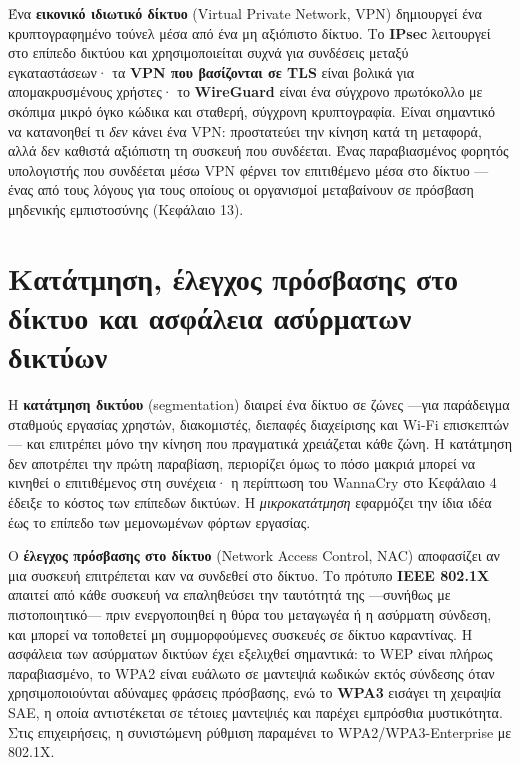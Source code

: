 Ένα \textbf{εικονικό ιδιωτικό δίκτυο} (Virtual Private Network, VPN) δημιουργεί ένα κρυπτογραφημένο τούνελ μέσα από ένα μη αξιόπιστο δίκτυο. Το \textbf{IPsec} λειτουργεί στο επίπεδο δικτύου και χρησιμοποιείται συχνά για συνδέσεις μεταξύ εγκαταστάσεων· τα \textbf{VPN που βασίζονται σε TLS} είναι βολικά για απομακρυσμένους χρήστες· το \textbf{WireGuard} είναι ένα σύγχρονο πρωτόκολλο με σκόπιμα μικρό όγκο κώδικα και σταθερή, σύγχρονη κρυπτογραφία. Είναι σημαντικό να κατανοηθεί τι \emph{δεν} κάνει ένα VPN: προστατεύει την κίνηση κατά τη μεταφορά, αλλά δεν καθιστά αξιόπιστη τη συσκευή που συνδέεται. Ένας παραβιασμένος φορητός υπολογιστής που συνδέεται μέσω VPN φέρνει τον επιτιθέμενο μέσα στο δίκτυο —ένας από τους λόγους για τους οποίους οι οργανισμοί μεταβαίνουν σε πρόσβαση μηδενικής εμπιστοσύνης (Κεφάλαιο 13).

\section{Κατάτμηση, έλεγχος πρόσβασης στο δίκτυο και ασφάλεια ασύρματων δικτύων}\label{sec:6.6}
Η \textbf{κατάτμηση δικτύου} (segmentation) διαιρεί ένα δίκτυο σε ζώνες —για παράδειγμα σταθμούς εργασίας χρηστών, διακομιστές, διεπαφές διαχείρισης και Wi-Fi επισκεπτών— και επιτρέπει μόνο την κίνηση που πραγματικά χρειάζεται κάθε ζώνη. Η κατάτμηση δεν αποτρέπει την πρώτη παραβίαση, περιορίζει όμως το πόσο μακριά μπορεί να κινηθεί ο επιτιθέμενος στη συνέχεια· η περίπτωση του WannaCry στο Κεφάλαιο 4 έδειξε το κόστος των επίπεδων δικτύων. Η \emph{μικροκατάτμηση} εφαρμόζει την ίδια ιδέα έως το επίπεδο των μεμονωμένων φόρτων εργασίας.

Ο \textbf{έλεγχος πρόσβασης στο δίκτυο} (Network Access Control, NAC) αποφασίζει αν μια συσκευή επιτρέπεται καν να συνδεθεί στο δίκτυο. Το πρότυπο \textbf{IEEE 802.1X} απαιτεί από κάθε συσκευή να επαληθεύσει την ταυτότητά της —συνήθως με πιστοποιητικό— πριν ενεργοποιηθεί η θύρα του μεταγωγέα ή η ασύρματη σύνδεση, και μπορεί να τοποθετεί μη συμμορφούμενες συσκευές σε δίκτυο καραντίνας. Η ασφάλεια των ασύρματων δικτύων έχει εξελιχθεί σημαντικά: το WEP είναι πλήρως παραβιασμένο, το WPA2 είναι ευάλωτο σε μαντεψιά κωδικών εκτός σύνδεσης όταν χρησιμοποιούνται αδύναμες φράσεις πρόσβασης, ενώ το \textbf{WPA3} εισάγει τη χειραψία SAE, η οποία αντιστέκεται σε τέτοιες μαντεψιές και παρέχει εμπρόσθια μυστικότητα. Στις επιχειρήσεις, η συνιστώμενη ρύθμιση παραμένει το WPA2/WPA3-Enterprise με 802.1X.

